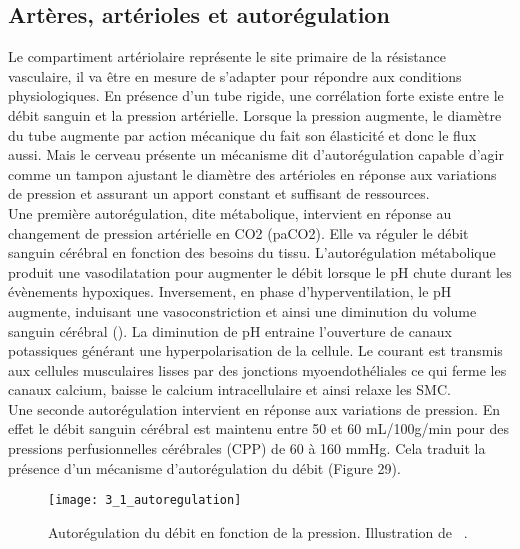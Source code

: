 \subsection{Artères, artérioles et autorégulation}
Le compartiment artériolaire représente le site primaire de la résistance vasculaire, il va être
en mesure de s’adapter pour répondre aux conditions physiologiques. En présence d’un tube rigide,
une corrélation forte existe entre le débit sanguin et la pression artérielle. Lorsque la pression
augmente, le diamètre du tube augmente par action mécanique du fait son élasticité et donc le flux
aussi. Mais le cerveau présente un mécanisme dit d’autorégulation capable d’agir comme un tampon
ajustant le diamètre des artérioles en réponse aux variations de pression et assurant un apport
constant et suffisant de ressources.\\			
Une première autorégulation, dite métabolique, intervient en réponse au changement de
pression artérielle en CO2 (paCO2). Elle va réguler le débit sanguin cérébral en fonction des besoins du
tissu. L’autorégulation métabolique produit une vasodilatation pour augmenter le débit lorsque le pH
chute durant les évènements hypoxiques. Inversement, en phase d’hyperventilation, le pH augmente,
induisant une vasoconstriction et ainsi une diminution du volume sanguin cérébral (\cite{Hajjar2010}). La diminution
de pH entraine l’ouverture de canaux potassiques générant une hyperpolarisation de la cellule. Le
courant est transmis aux cellules musculaires lisses par des jonctions myoendothéliales ce qui ferme
les canaux calcium, baisse le calcium intracellulaire et ainsi relaxe les SMC.\\	
Une seconde autorégulation intervient en réponse aux variations de pression. En effet le débit
sanguin cérébral est maintenu entre 50 et 60 mL/100g/min pour des pressions perfusionnelles cérébrales (CPP) de 60 à 160 mmHg. Cela traduit la présence d’un mécanisme d’autorégulation du
débit (Figure 29). 
\begin{figure}[!t]
\centering
\texttt{[image: 3\_1\_autoregulation]}
\caption{Autorégulation du débit en fonction de la pression. Illustration de ~\cite{Lang2003}.}
\label{fig:3_1_autoregulation}	
\end{figure}

